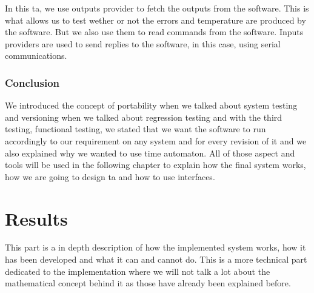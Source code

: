 \documentclass[12pt]{article}
\theoremstyle{definition}
\theoremstyle{definition}
\theoremstyle{remark}
\begin{document}
In this \gls{ta}, we use outputs provider to fetch the outputs from the software. This is what allows us to test wether or not the errors and temperature are produced by the software. But we also use them to read commands from the software. Inputs providers are used to send replies to the software, in this case, using serial communications.



\section{Conclusion}


We introduced the concept of portability when we talked about system testing and versioning when we talked about regression testing and with the third testing, functional testing, we stated that we want the software to run accordingly to our requirement on any system and for every revision of it and we also explained why we wanted to use time automaton. All of those aspect and tools will be used in the following chapter to explain how the final system works, how we are going to design \gls{ta} and how to use interfaces.



\clearpage
\part{Results}
\label{chap:Results}

This part is a in depth description of how the implemented system works, how it has been developed and what it can and cannot do. This is a more technical part dedicated to the implementation where we will not talk a lot about the mathematical concept behind it as those have already been explained before.\\
\end{document}
